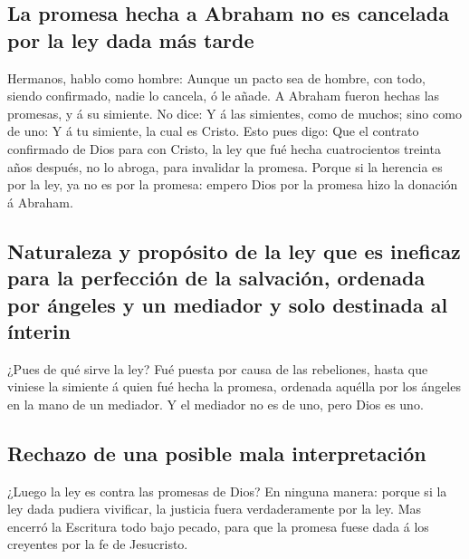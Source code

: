 \hypertarget{la-promesa-hecha-a-abraham-no-es-cancelada-por-la-ley-dada-muxe1s-tarde}{%
\subsection{La promesa hecha a Abraham no es cancelada por la ley dada
más
tarde}\label{la-promesa-hecha-a-abraham-no-es-cancelada-por-la-ley-dada-muxe1s-tarde}}

 Hermanos, hablo como hombre: Aunque un pacto sea de
hombre, con todo, siendo confirmado, nadie lo cancela, ó le añade.
 A Abraham fueron hechas las promesas, y á su simiente.
No dice: Y á las simientes, como de muchos; sino como de uno: Y á tu
simiente, la cual es Cristo.  Esto pues digo: Que el
contrato confirmado de Dios para con Cristo, la ley que fué hecha
cuatrocientos treinta años después, no lo abroga, para invalidar la
promesa.  Porque si la herencia es por la ley, ya no es
por la promesa: empero Dios por la promesa hizo la donación á Abraham.

\hypertarget{naturaleza-y-propuxf3sito-de-la-ley-que-es-ineficaz-para-la-perfecciuxf3n-de-la-salvaciuxf3n-ordenada-por-uxe1ngeles-y-un-mediador-y-solo-destinada-al-uxednterin}{%
\subsection{Naturaleza y propósito de la ley que es ineficaz para la
perfección de la salvación, ordenada por ángeles y un mediador y solo
destinada al
ínterin}\label{naturaleza-y-propuxf3sito-de-la-ley-que-es-ineficaz-para-la-perfecciuxf3n-de-la-salvaciuxf3n-ordenada-por-uxe1ngeles-y-un-mediador-y-solo-destinada-al-uxednterin}}

 ¿Pues de qué sirve la ley? Fué puesta por causa de las
rebeliones, hasta que viniese la simiente á quien fué hecha la promesa,
ordenada aquélla por los ángeles en la mano de un mediador.
 Y el mediador no es de uno, pero Dios es uno.

\hypertarget{rechazo-de-una-posible-mala-interpretaciuxf3n}{%
\subsection{Rechazo de una posible mala
interpretación}\label{rechazo-de-una-posible-mala-interpretaciuxf3n}}

 ¿Luego la ley es contra las promesas de Dios? En ninguna
manera: porque si la ley dada pudiera vivificar, la justicia fuera
verdaderamente por la ley.  Mas encerró la Escritura todo
bajo pecado, para que la promesa fuese dada á los creyentes por la fe de
Jesucristo.

